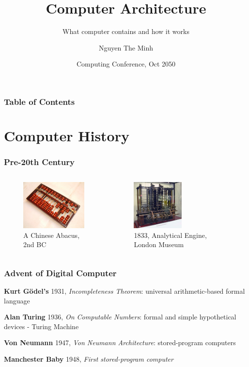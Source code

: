 \documentclass[xcolor={table, dvipsnames}]{beamer}
\title{Computer Architecture}
\subtitle{What computer contains and how it works}
\author{Nguyen The Minh}
\institute{Electronics and Computer Science Home}
\date{Computing Conference, Oct 2050}
\begin{document}
\frame{\titlepage}

\begin{frame}
\frametitle{Table of Contents}
\tableofcontents
\end{frame}

\section{Computer History}
\begin{frame}
\frametitle{Pre-20th Century}

\begin{columns}
\begin{figure}[h!]
  \includegraphics[height=2.5cm]{img/abacus.jpeg}
    \caption{A Chinese Abacus, 2nd BC}
\end{figure}
\begin{figure}[h!]
  \includegraphics[height=2.5cm]{img/AnalyticalMachine.jpg}
    \caption{1833, Analytical Engine, London Museum}
\end{figure}
\end{columns}

\end{frame}

\begin{frame}
\frametitle{Advent of Digital Computer}

\textbf{Kurt Gödel's} 1931, \textit{Incompleteness Theorem}: universal arithmetic-based formal language \newline \pause

\textbf{Alan Turing} 1936, \textit{On Computable Numbers}:  formal and simple hypothetical devices - Turing Machine  \newline \pause

\textbf{Von Neumann} 1947, \textit{Von Neumann Architecture}: stored-program computers \newline \pause

\textbf{Manchester Baby} 1948, \textit{First stored-program computer} 

\end{frame}
\end{document}
